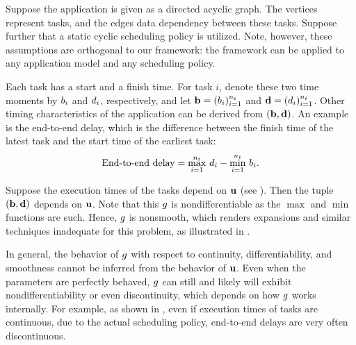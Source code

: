 Suppose the application is given as a directed acyclic graph. The vertices
represent tasks, and the edges data dependency between these tasks. Suppose
further that a static cyclic scheduling policy is utilized. Note, however, these
assumptions are orthogonal to our framework: the framework can be applied to any
application model and any scheduling policy.

Each task has a start and a finish time. For task $i$, denote these two time
moments by $b_i$ and $d_i$, respectively, and let $\mathbf{b} = (b_i)_{i=1}^{n_t}$ and
$\mathbf{d} = (d_i)_{i=1}^{n_t}$. Other timing characteristics of the application can be
derived from $(\mathbf{b}, \mathbf{d})$. An example is the end-to-end delay, which is the
difference between the finish time of the latest task and the start time of the
earliest task:
\begin{equation} \elab{end-to-end-delay}
  \text{End-to-end delay} = \max_{i = 1}^\nt \, \d_i - \min_{i = 1}^\nt \, \b_i.
\end{equation}

Suppose the execution times of the tasks depend on $\mathbf{u}$ (see ).
Then the tuple $(\mathbf{b}, \mathbf{d})$ depends on $\mathbf{u}$.  Note that this $g$ is nondifferentiable as
the $\max$ and $\min$ functions are such. Hence, $g$ is nonsmooth, which
renders  expansions and similar techniques inadequate for this problem,
as illustrated in .

\begin{remark} 
In general, the behavior of $g$ with respect to continuity, differentiability,
and smoothness cannot be inferred from the behavior of $\mathbf{u}$. Even when the
parameters are perfectly behaved, $g$ can still and likely will exhibit
nondifferentiability or even discontinuity, which depends on how $g$ works
internally. For example, as shown in \cite{tanasa2015}, even if execution times
of tasks are continuous, due to the actual scheduling policy, end-to-end delays
are very often discontinuous.
\end{remark}
